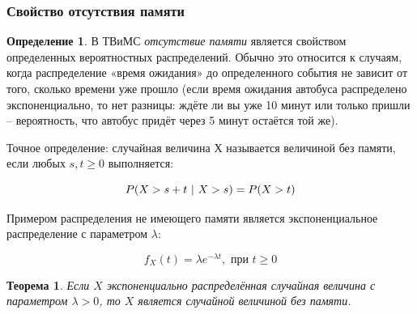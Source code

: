 \documentclass[a4paper,12pt]{article}
\newtheorem{theorem}{Теорема}
\theoremstyle{definition}
\newtheorem{definition}{Определение}[section]
\begin{document}
\subsubsection{Свойство отсутствия памяти}

\begin{definition}\label{def:memoryless_distr}
    В ТВиМС \textit{отсутствие памяти} является свойством определенных вероятностных распределений. Обычно это относится к случаям, когда распределение «время ожидания» до определенного события не зависит от того, сколько времени уже прошло (если время ожидания автобуса распределено экспоненциально, то нет разницы: ждёте ли вы уже 10 минут или только пришли – вероятность, что автобус придёт через 5 минут остаётся той же).

    Точное определение: случайная величина Х называется величиной без памяти, если любых $s,t \ge 0$ выполняется:
    
    \begin{equation}\label{eq:memoryless_d_prob}
        P(X > s + t\textup{ | }X > s)  = P(X > t)
    \end{equation}
    
\end{definition}

Примером распределения не имеющего памяти является экспоненциальное распределение с параметром $\lambda$: 
    
\begin{equation}\label{def:exponential_distribution}
    f_X (t) = \lambda e^{-\lambda t}, \textbf{\ при\ } t \ge 0
\end{equation}

\begin{theorem}
Если $X$ экспоненциально распределённая случайная величина с параметром $\lambda > 0$, то $X$ является случайной величиной без памяти.
\end{theorem}
\end{document}
